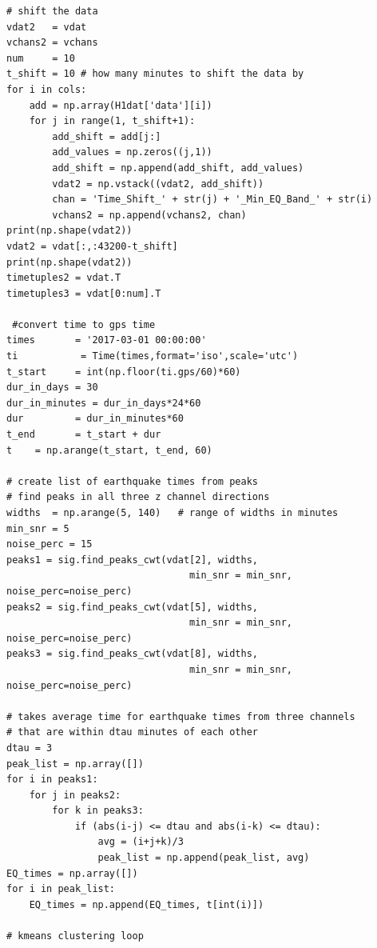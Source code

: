 \documentclass[colorlinks=true,pdfstartview=FitV,linkcolor=blue,
            citecolor=red,urlcolor=magenta]{ligodoc}
\begin{document}
\begin{verbatim}
# shift the data
vdat2   = vdat
vchans2 = vchans
num     = 10
t_shift = 10 # how many minutes to shift the data by
for i in cols:
    add = np.array(H1dat['data'][i])
    for j in range(1, t_shift+1):
        add_shift = add[j:]
        add_values = np.zeros((j,1))
        add_shift = np.append(add_shift, add_values)
        vdat2 = np.vstack((vdat2, add_shift))
        chan = 'Time_Shift_' + str(j) + '_Min_EQ_Band_' + str(i)
        vchans2 = np.append(vchans2, chan)
print(np.shape(vdat2))
vdat2 = vdat[:,:43200-t_shift]
print(np.shape(vdat2))
timetuples2 = vdat.T
timetuples3 = vdat[0:num].T

 #convert time to gps time
times       = '2017-03-01 00:00:00'
ti           = Time(times,format='iso',scale='utc')
t_start     = int(np.floor(ti.gps/60)*60)
dur_in_days = 30
dur_in_minutes = dur_in_days*24*60
dur         = dur_in_minutes*60
t_end       = t_start + dur
t    = np.arange(t_start, t_end, 60)

# create list of earthquake times from peaks
# find peaks in all three z channel directions
widths  = np.arange(5, 140)   # range of widths in minutes
min_snr = 5
noise_perc = 15
peaks1 = sig.find_peaks_cwt(vdat[2], widths,
                                min_snr = min_snr, noise_perc=noise_perc)
peaks2 = sig.find_peaks_cwt(vdat[5], widths,
                                min_snr = min_snr, noise_perc=noise_perc)
peaks3 = sig.find_peaks_cwt(vdat[8], widths,
                                min_snr = min_snr, noise_perc=noise_perc)

# takes average time for earthquake times from three channels
# that are within dtau minutes of each other 
dtau = 3
peak_list = np.array([])
for i in peaks1:
    for j in peaks2:
        for k in peaks3:
            if (abs(i-j) <= dtau and abs(i-k) <= dtau):
                avg = (i+j+k)/3
                peak_list = np.append(peak_list, avg)
EQ_times = np.array([])
for i in peak_list:
    EQ_times = np.append(EQ_times, t[int(i)])

# kmeans clustering loop


\end{verbatim}
\end{document}
